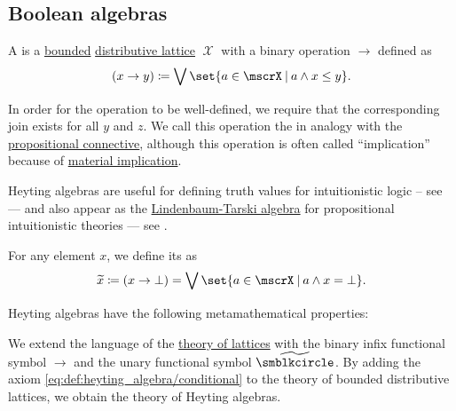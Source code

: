 \subsection{Boolean algebras}\label{subsec:boolean_algebras}

\begin{definition}\label{def:heyting_algebra}
  A  is a \hyperref[def:semilattice/bounded]{bounded} \hyperref[def:semilattice/distributive_lattice]{distributive lattice} \( \mscrX \) with a binary operation \( \rightarrow \) defined as
  \begin{equation}\label{eq:def:heyting_algebra/conditional}
    (x \rightarrow y) \coloneqq \bigvee\set{ a \in \mscrX \given a \wedge x \leq y }.
  \end{equation}

  In order for the operation to be well-defined, we require that the corresponding join exists for all \( y \) and \( z \). We call this operation the  in analogy with the \hyperref[def:propositional_language/connectives/conditional]{propositional connective}, although this operation is often called \enquote{implication} because of \hyperref[def:material_implication]{material implication}.

  Heyting algebras are useful for defining truth values for intuitionistic logic -- see  --- and also appear as the \hyperref[def:lindenbaum_tarski_algebra]{Lindenbaum-Tarski algebra} for propositional intuitionistic theories --- see .

  \begin{thmenum}[series=def:heyting_algebra]
     For any element \( x \), we define its  as
    \begin{equation}\label{eq:def:heyting_algebra/pseudocomplement}
      \widetilde x
      \coloneqq
      (x \rightarrow \bot)
      =
      \bigvee\set{ a \in \mscrX \given a \wedge x = \bot }.
    \end{equation}
  \end{thmenum}

  Heyting algebras have the following metamathematical properties:
  \begin{thmenum}[resume=def:heyting_algebra]
     We extend the language of the \hyperref[def:semilattice/theory]{theory of lattices} with the binary infix functional symbol \( \rightarrow \) and the unary functional symbol \( \widetilde{\anon} \). By adding the axiom \eqref{eq:def:heyting_algebra/conditional} to the theory of bounded distributive lattices, we obtain the theory of Heyting algebras.


\end{thmenum}
\end{definition}
